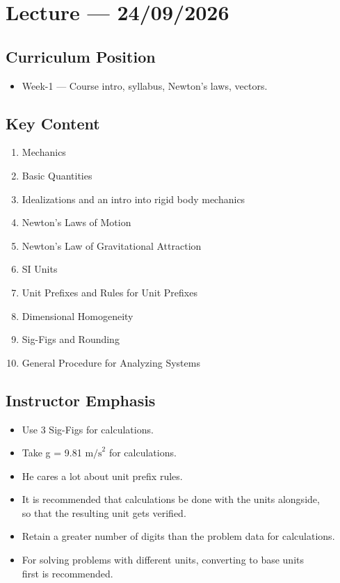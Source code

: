 \section{Lecture — 24/09/2026}


\subsection*{Curriculum Position}
\begin{itemize}
	\item Week-1 — Course intro, syllabus, Newton's laws, vectors.
\end{itemize}


\subsection*{Key Content}
\begin{enumerate}
	\item Mechanics 
	\item Basic Quantities 
	\item Idealizations and an intro into rigid body mechanics 
	\item Newton's Laws of Motion
	\item Newton's Law of Gravitational Attraction 
	\item SI Units
	\item Unit Prefixes and Rules for Unit Prefixes
	\item Dimensional Homogeneity
	\item Sig-Figs and Rounding
	\item General Procedure for Analyzing Systems
\end{enumerate}


\subsection*{Instructor Emphasis}
\begin{itemize}
	\item Use 3 Sig-Figs for calculations.
	\item Take g = 9.81 $ \text{m/s}^2 $ for calculations.
	\item He cares a lot about unit prefix rules.
	\item It is recommended that calculations be done with the units alongside, \\
	so that the resulting unit gets verified.
	\item Retain a greater number of digits than the problem data for calculations.
	\item For solving problems with different units, converting to base units \\ 
	first is recommended.
\end{itemize}


